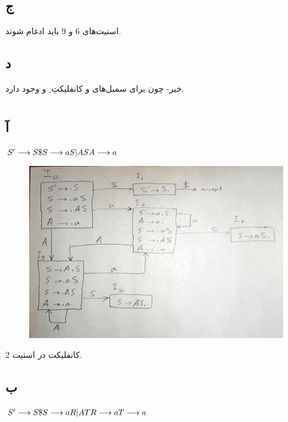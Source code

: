 \documentclass{article}
\begin{document}
\subsection{ج}
استیت‌های 6 و 9 باید ادغام شوند.

\subsection{د}
خیر- چون برای سمبل‌های  و  کانفلیکتِ ِ   و  وجود دارد.



\section{}%
\subsection{آ}
\begin{latin}
$\\
S^\prime \longrightarrow S \$ \\
S \longrightarrow a S | A S \\
A \longrightarrow a
$
\end{latin}

\begin{figure}[H]
    \centering
    \includegraphics[width=1.0\textwidth]{figures/7a.jpg}
    \caption
	{}
    \label{fig:fig1}
\end{figure}

کانفلیکت در استیت 2.


\subsection{ب}
\begin{latin}
$\\
S^\prime \longrightarrow S \$ \\
S \longrightarrow a R | A T \\
R \longrightarrow a \\
T \longrightarrow a
$
\end{latin}
\end{document}
